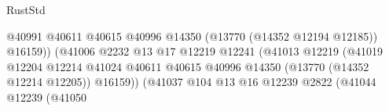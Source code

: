 \begin{lexlean}{RustStd}
\begin{coremodule}
                                                                    @40991
                                                                    @40611
                                                                    @40615
                                                                    @40996
                                                                    @14350
                                                                    (@13770 (@14352 @12194 @12185))
                                                                    @16159))
                                                                (@41006
                                                                  @2232
                                                                  @13
                                                                  @17
                                                                  @12219
                                                                  @12241
                                                                  (@41013
                                                                    @12219
                                                                    (@41019
                                                                      @12204
                                                                      @12214
                                                                      @41024
                                                                      @40611
                                                                      @40615
                                                                      @40996
                                                                      @14350
                                                                      (@13770
                                                                        (@14352 @12214 @12205))
                                                                      @16159))
                                                                  (@41037
                                                                    @104
                                                                    @13
                                                                    @16
                                                                    @12239
                                                                    @2822
                                                                    (@41044
                                                                      @12239
                                                                      (@41050

\end{coremodule}
\end{lexlean}
